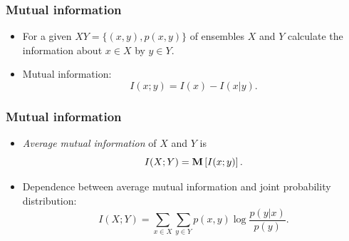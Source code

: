 \documentclass[14pt]{beamer}
\begin{document}

\begin{frame}
\frametitle{Mutual information}
\begin{itemize}

    \item
    For a given $XY = \{(x,y),p(x,y)\}$ of ensembles $X$ and $Y$ calculate the information about $x \in X$ by $y \in Y$.
    
    \pause \item
    Mutual information:
    \begin{equation}
    \label{eq5_2} I(x;y) = I(x) - I(x\vert y).
    \end{equation}
    
    
    
\end{itemize}
\end{frame}


\begin{frame}
\frametitle{Mutual information}
\begin{itemize}
    \item
    \textit{Average mutual information} of $X$ and $Y$ is
    \[
    I(X;Y) = {\rm {\bf M}}\left[ {I(x;y)} \right].
    \]
    
    \pause \item
    Dependence between average mutual information and joint probability distribution:
    \begin{equation}
    \label{eq5_3} I(X;Y) = \sum\limits_{x \in X} {\sum\limits_{y \in
    Y} {p(x,y)\log \frac{p(y\vert x)}{p(y)}} } .
    \end{equation}
    
\end{itemize}
\end{frame}
\end{document}
